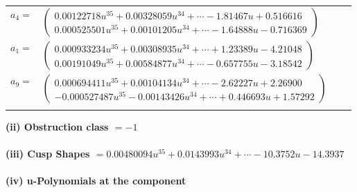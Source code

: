 \documentclass[1p]{elsarticle_modified}
\theoremstyle{definition}
\begin{document}
\begin{tabular}{m{7pt} m{180pt} m{7pt} m{180pt} }
\flushright $a_{4}=$&$\begin{pmatrix}0.00122718 u^{35}+0.00328059 u^{34}+\cdots-1.81467 u+0.516616\\0.000525501 u^{35}+0.00101205 u^{34}+\cdots-1.64888 u-0.716369\end{pmatrix}$ \\
\flushright $a_{1}=$&$\begin{pmatrix}0.000933234 u^{35}+0.00308935 u^{34}+\cdots+1.23389 u-4.21048\\0.00191049 u^{35}+0.00584877 u^{34}+\cdots-0.657755 u-3.18542\end{pmatrix}$ \\
\flushright $a_{9}=$&$\begin{pmatrix}0.000694411 u^{35}+0.00104134 u^{34}+\cdots-2.62227 u+2.26900\\-0.000527487 u^{35}-0.00143426 u^{34}+\cdots+0.446693 u+1.57292\end{pmatrix}$\\&\end{tabular}
\flushleft \textbf{(ii) Obstruction class $= -1$}\\~\\
\flushleft \textbf{(iii) Cusp Shapes $= 0.00480094 u^{35}+0.0143993 u^{34}+\cdots-10.3752 u-14.3937$}\\~\\
\newpage\renewcommand{\arraystretch}{1}
\flushleft \textbf{(iv) u-Polynomials at the component}\newline \\
\end{document}
